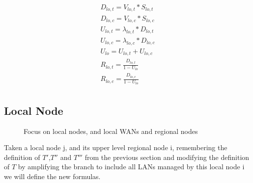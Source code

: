\documentclass[11pt]{article}
\begin{document}
\begin{equation}
    \begin{array}{l}
        D_{lo, t} = V_{lo, t} * S_{lo, t} \\
        D_{lo, c} = V_{lo, c} * S_{lo, c} \\
        U_{lo, t} = \lambda_{lo, t} * D_{lo, t} \\
        U_{lo, c} = \lambda_{lo, c} * D_{lo, c} \\
        U_{lo} = U_{lo, t} + U_{lo, c} \\
        R_{lo, t} = \frac{D_{lo, t}}{1 - U_{lo}} \\
        R_{lo, c} = \frac{D_{lo, c}}{1 - U_{lo}} \\
    \end{array}
\end{equation}

\subsection{Local Node}
\begin{figure}[H]
	\centering
	\hspace*{-3.7cm}
	\frame{}
	\caption{Focus on local nodes, and local WANs and regional nodes}
\end{figure}

Taken a local node j, and its upper level regional node i, remembering the definition of $T'$,$T''$ and $T'''$ from the previous section and modifying the definition of $T$ by amplifying the branch to include all LANs managed by this local node i we will define the new formulas.\\
\end{document}
